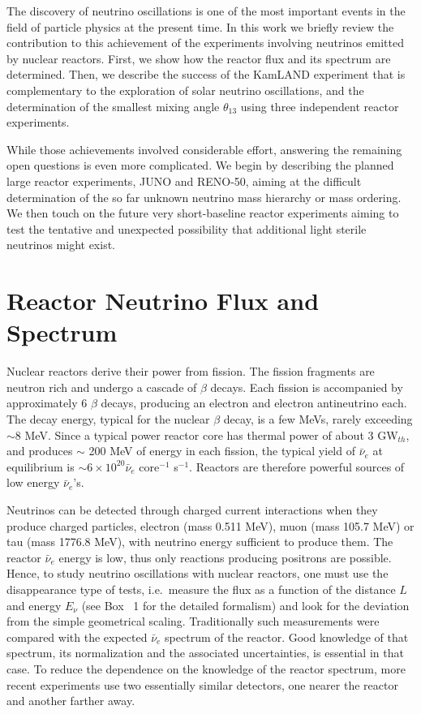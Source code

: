 \documentclass[aps,twocolumn,preprintnumbers,amsmath,superscriptaddress,amssymb,floats,nofootinbib]{revtex4-1}
\begin{document}
The discovery of neutrino oscillations is one of the most important events in the
field of particle physics at the present time. In this work we briefly review the
contribution to this achievement of the experiments involving neutrinos emitted
by nuclear reactors. First, we show how the reactor flux and its
spectrum are determined. Then, we describe the success of the
KamLAND experiment that is complementary to the exploration of solar neutrino
oscillations, and the determination of the smallest mixing angle
$\theta_{13}$ using three independent reactor experiments.

While those achievements involved considerable effort, answering the remaining
open questions is even more complicated. We begin by describing the planned large reactor experiments, JUNO and RENO-50, aiming at the difficult determination
of the so far unknown neutrino mass hierarchy or mass ordering.  We then touch on the future very short-baseline reactor experiments aiming to test the tentative and unexpected
possibility that additional light sterile neutrinos might exist.

\section{Reactor Neutrino Flux and Spectrum}
\label{sec:flux}

Nuclear reactors derive their power from fission. The fission fragments are neutron rich and undergo a cascade of $\beta$ decays.
Each fission is accompanied by approximately 6 $\beta$ decays, producing an electron and electron antineutrino each.
The decay energy, typical for the nuclear $\beta$ decay, is a few MeVs, rarely exceeding $\sim$8 MeV.
Since a typical power reactor core has thermal power of about 3 GW$_{th}$, and produces
$\sim$ 200 MeV of energy in each fission, the typical yield of $\bar{\nu}_e$ at equilibrium is $\sim 6 \times 10^{20} \bar{\nu}_e$ core$^{-1}$ s$^{-1}$.
Reactors are therefore powerful sources of low energy $\bar{\nu}_e$'s.

Neutrinos can be detected through charged current interactions when they produce charged particles, electron (mass 0.511 MeV),
muon (mass 105.7 MeV) or tau (mass 1776.8 MeV), with neutrino energy sufficient to
produce them. The reactor $\bar{\nu}_e$ energy is low, thus only reactions producing positrons are possible. Hence, to study neutrino oscillations with nuclear reactors, one must use the disappearance type of tests, i.e.~measure the flux as a function of the distance $L$ and energy $E_{\nu}$ (see Box ~1 for the detailed formalism) and
look for the deviation from the simple geometrical scaling. Traditionally such measurements were compared with the expected  $\bar{\nu}_e$ spectrum
of the reactor. Good knowledge of that spectrum, its normalization and the associated uncertainties, is essential in that case.
To reduce the dependence on the knowledge of the reactor spectrum, more recent experiments
\cite{Dayabay,Reno} use two essentially similar detectors, one nearer the reactor and another farther away.
\end{document}
